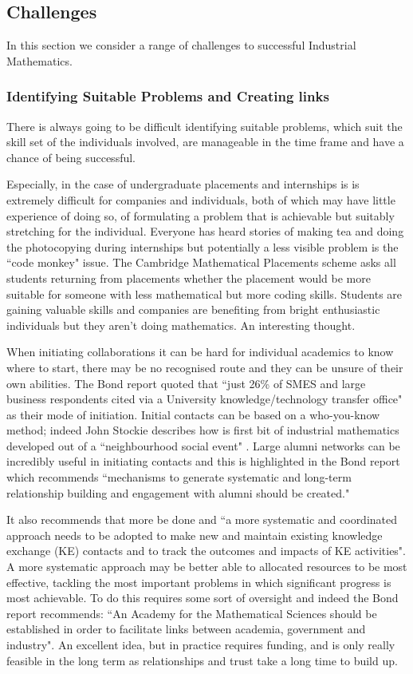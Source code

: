 \documentclass[11pt]{article} %
\begin{document}
	\subsection{Challenges} 
	In this section we consider a range of challenges to successful Industrial Mathematics. 
	
	\subsubsection{Identifying Suitable Problems and Creating links} 
	
	There is always going to be difficult identifying suitable problems, which suit the skill set of the individuals involved, are manageable in the time frame and have a chance of being successful. 
	
	Especially, in the case of undergraduate placements and internships is is extremely difficult for companies and individuals, both of which may have little experience of doing so, of formulating a problem that is achievable but suitably stretching for the individual. Everyone has heard stories of making tea and doing the photocopying during internships but potentially a less visible problem is the ``code monkey" issue. The Cambridge Mathematical Placements scheme asks all students returning from placements whether the placement would be more suitable for someone with less mathematical but more coding skills. Students are gaining valuable skills and companies are benefiting from bright enthusiastic individuals but they aren't doing mathematics. An interesting thought. 
	
	
	
	When initiating collaborations it can be hard for individual academics to know where to start, there may be  no recognised route and they can be  unsure of their own abilities.	The Bond report quoted that ``just 26\% of SMES and large business respondents cited via a University knowledge/technology transfer office" as their mode of initiation. Initial contacts can be based on a who-you-know  method; indeed John Stockie describes how is first bit of industrial mathematics developed out of a  ``neighbourhood social event" \cite{Stockie2015}. Large alumni networks can be incredibly useful in initiating contacts and this is highlighted in the Bond report \cite{Bond}  which recommends ``mechanisms to generate systematic and long-term relationship building and engagement with alumni should be created."
	
	It also recommends that more be done  and ``a more systematic and coordinated approach needs to be adopted to make new and maintain existing knowledge exchange (KE) contacts and to track the outcomes and impacts of KE activities". A more systematic approach may be better able to allocated resources to be most effective, tackling the most important problems in which significant progress is most achievable. To do this requires some sort of oversight and indeed the Bond report recommends: ``An Academy for the Mathematical Sciences should be established in order to facilitate links between academia, government and industry". An excellent idea, but in practice requires funding, and is only really feasible in the long term as relationships and trust take a long time to build up. 
	
\end{document}

